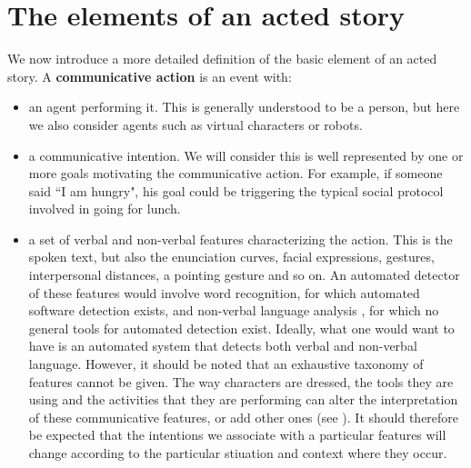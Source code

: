 \documentclass[
		twoside,openright,titlepage,numbers=noenddot,manychapters,
		headinclude,%
                footinclude=false,cleardoublepage=empty,
                BCOR=5mm,
		fontsize=11pt, %
                 enabledeprecatedfontcommands]{scrreprt}
\begin{document}
\section{The elements of an acted story}

We now introduce a more detailed definition of the basic element of  an acted story. A \textbf{communicative action} is an event with:

 \begin{itemize}
    \item an agent performing it. This is generally understood to be a person, but here we also consider agents such as virtual characters or robots.
   \item a communicative intention. We will consider this is well represented by one or more goals motivating the communicative action. For example, if someone said ``I am hungry", his goal could be triggering the typical social protocol involved in going for lunch.%
   \item a set of verbal and non-verbal features characterizing the action. This is the spoken text, but also the enunciation curves, facial expressions, gestures, interpersonal distances, a pointing gesture and so on.
       An automated detector of these features would involve word recognition, for which automated software detection exists, and non-verbal language analysis%
, for which no general tools for automated detection exist. Ideally, what one would want to have is an automated system that detects both verbal and non-verbal language. %
       However, it should be noted that an exhaustive taxonomy of features cannot be given. The way characters are dressed, the tools they are using and the activities that they are performing can alter the interpretation of these communicative features, or add other ones (see \cite{poyatos2002nca}).%
 It should therefore be expected that the intentions we associate with a particular features will change according to the particular stiuation and context where they occur.      
 \end{itemize}
\end{document}
